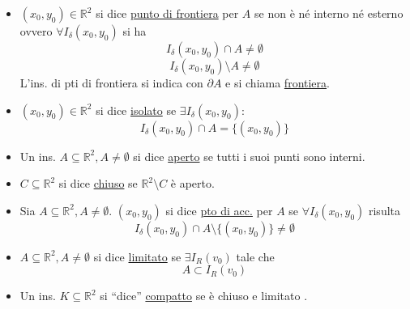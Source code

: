 \begin{itemize}
    \item $(x_0, y_0) \in \mathbb{R}^2$ si dice \underline{punto di frontiera} per $A$ se non è né interno né esterno ovvero $\forall I_\delta(x_0, y_0)$ si ha
    \[
    I_\delta(x_0, y_0) \cap A \neq \emptyset
    \]
    \[
    I_\delta(x_0, y_0) \setminus A \neq \emptyset
    \]
    L'ins. di pti di frontiera si indica con \underline{$\partial A$} e si chiama \underline{frontiera}.

    \item $(x_0, y_0) \in \mathbb{R}^2$ si dice \underline{isolato} se $\exists I_\delta(x_0, y_0)$:
    \[
    I_\delta(x_0, y_0) \cap A = \{ (x_0, y_0) \}
    \]

    \item Un ins. $A \subseteq \mathbb{R}^2, A \neq \emptyset$ si dice \underline{aperto} se tutti i suoi punti sono interni.

    \item $C \subseteq \mathbb{R}^2$ si dice \underline{chiuso} se $\mathbb{R}^2 \setminus C$ è aperto.
\end{itemize}

\begin{center}
\end{center}

\begin{itemize}
    \item Sia $A \subseteq \mathbb{R}^2, A \neq \emptyset$. $(x_0, y_0)$ si dice \underline{pto di acc.} per $A$ se $\forall I_\delta(x_0, y_0)$ risulta
    \[
    I_\delta(x_0, y_0) \cap A \setminus \{ (x_0, y_0) \} \neq \emptyset
    \]

    \item $A \subseteq \mathbb{R}^2, A \neq \emptyset$ si dice \underline{limitato} se $\exists I_R(v_0)$ tale che
    \[
    A \subset I_R(v_0)
    \]

    \item Un ins. $K \subseteq \mathbb{R}^2$ si ``dice'' \underline{compatto} se è chiuso e limitato .
\end{itemize}

